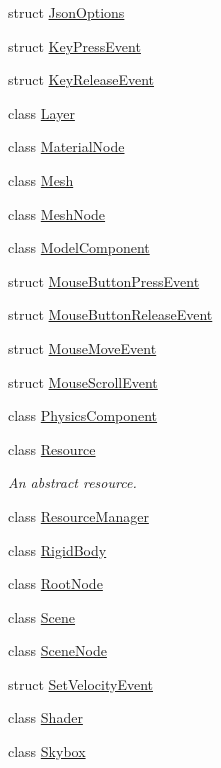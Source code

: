 \begin{DoxyCompactItemize}
struct \hyperlink{structTarbora_1_1JsonOptions}{Json\+Options}
\item 
struct \hyperlink{structTarbora_1_1KeyPressEvent}{Key\+Press\+Event}
\item 
struct \hyperlink{structTarbora_1_1KeyReleaseEvent}{Key\+Release\+Event}
\item 
class \hyperlink{classTarbora_1_1Layer}{Layer}
\item 
class \hyperlink{classTarbora_1_1MaterialNode}{Material\+Node}
\item 
class \hyperlink{classTarbora_1_1Mesh}{Mesh}
\item 
class \hyperlink{classTarbora_1_1MeshNode}{Mesh\+Node}
\item 
class \hyperlink{classTarbora_1_1ModelComponent}{Model\+Component}
\item 
struct \hyperlink{structTarbora_1_1MouseButtonPressEvent}{Mouse\+Button\+Press\+Event}
\item 
struct \hyperlink{structTarbora_1_1MouseButtonReleaseEvent}{Mouse\+Button\+Release\+Event}
\item 
struct \hyperlink{structTarbora_1_1MouseMoveEvent}{Mouse\+Move\+Event}
\item 
struct \hyperlink{structTarbora_1_1MouseScrollEvent}{Mouse\+Scroll\+Event}
\item 
class \hyperlink{classTarbora_1_1PhysicsComponent}{Physics\+Component}
\item 
class \hyperlink{classTarbora_1_1Resource}{Resource}
\begin{DoxyCompactList}\small\item\em An abstract resource. \end{DoxyCompactList}\item 
class \hyperlink{classTarbora_1_1ResourceManager}{Resource\+Manager}
\item 
class \hyperlink{classTarbora_1_1RigidBody}{Rigid\+Body}
\item 
class \hyperlink{classTarbora_1_1RootNode}{Root\+Node}
\item 
class \hyperlink{classTarbora_1_1Scene}{Scene}
\item 
class \hyperlink{classTarbora_1_1SceneNode}{Scene\+Node}
\item 
struct \hyperlink{structTarbora_1_1SetVelocityEvent}{Set\+Velocity\+Event}
\item 
class \hyperlink{classTarbora_1_1Shader}{Shader}
\item 
class \hyperlink{classTarbora_1_1Skybox}{Skybox}
\item 

\end{DoxyCompactItemize}
